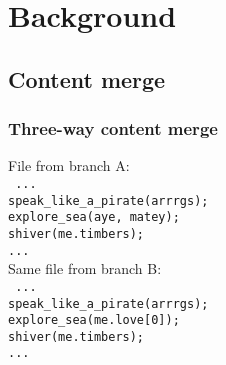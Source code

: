 \documentclass[compress,t]{beamer}
\begin{document}
\section[Background]{Background}
\subsection{Content merge}


\begin{frame}
  \frametitle{Three-way content merge}

  \vspace*{-\baselineskip}
  \begin{multicols}{2}
    File from branch A:\\
    {\footnotesize\texttt{%
    \quad{}...                             \\
    \quad{}speak\_like\_a\_pirate(arrrgs); \\
    \quad{}explore\_sea(aye, matey);\\
    \quad{}shiver(me.timbers);             \\
    \quad{}...                             \\
    }}
    \columnbreak
    \pause
    Same file from branch B:\\
    {\footnotesize\texttt{%
    \quad{}...                             \\
    \quad{}speak\_like\_a\_pirate(arrrgs); \\
    \quad{}explore\_sea(me.love[0]);\\
    \quad{}shiver(me.timbers);             \\
    \quad{}...
    }}
  \end{multicols}%



\end{frame}
\end{document}
